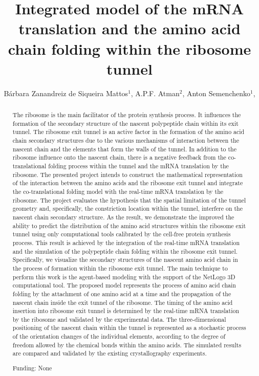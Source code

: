 \documentclass[twoside]{article}
\title{\vspace{-15mm}\fontsize{24pt}{10pt}\selectfont\textbf{ Integrated model of the mRNA translation and the amino acid chain folding within the ribosome tunnel }} %
\author{ Bárbara Zanandreiz de Siqueira Mattos$^{1}$, A.P.F. Atman$^{2}$, Anton Semenchenko$^{1}$, }
\affil{ 1 Centro Universitário Newton Paiva

2 CEFETMG

 }
\date{}
\begin{document}
  
  
  \maketitle %
  
  
  \thispagestyle{fancy} %
  
  
  \begin{abstract}
  The ribosome is the main facilitator of the protein synthesis process. It influences the formation of the secondary structure of the nascent polypeptide chain within its exit tunnel. The ribosome exit tunnel is an active factor in the formation of the amino acid chain secondary structures due to the various mechanisms of interaction between the nascent chain and the elements that form the walls of the tunnel. In addition to the ribosome influence onto the nascent chain, there is a negative feedback from the co-translational folding process within the tunnel and the mRNA translation by the ribosome. The presented project intends to construct the mathematical representation of the interaction between the amino acids and the ribosome exit tunnel and integrate the co-translational folding model with the real-time mRNA translation by the ribosome. The project evaluates the hypothesis that the spatial limitation of the tunnel geometry and, specifically, the constriction location within the tunnel, interfere on the nascent chain secondary structure. As the result, we demonstrate the improved the ability to predict the distribution of the amino acid structures within the ribosome exit tunnel using only computational tools calibrated by the cell-free protein synthesis process. This result is achieved by the integration of the real-time mRNA translation and the simulation of the polypeptide chain folding within the ribosome exit tunnel. Specifically, we visualize the secondary structures of the nascent amino acid chain in the process of formation within the ribosome exit tunnel. The main technique to perform this work is the agent-based modeling with the support of the NetLogo\textsuperscript{\textcopyright} 3D computational tool. The proposed model represents the process of amino acid chain folding by the attachment of one amino acid at a time and the propagation of the nascent chain inside the exit tunnel of the ribosome. The timing of the amino acid insertion into ribosome exit tunnel is determined by the real-time mRNA translation by the ribosome and validated by the experimental data. The three-dimensional positioning of the nascent chain within the tunnel is represented as a stochastic process of the orientation changes of the individual elements, according to the degree of freedom allowed by the chemical bonds within the amino acids. The simulated results are compared and validated by the existing crystallography experiments.
  
  Funding: None \\ 
  \end{abstract}
  
\end{document}
